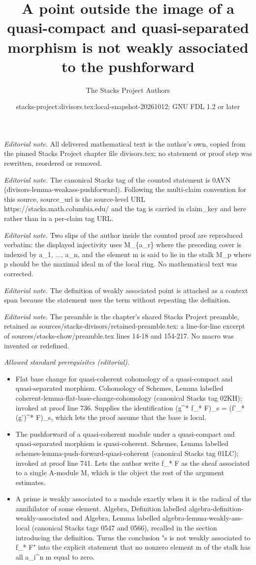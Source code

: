 \documentclass[10pt,a4paper]{amsart}
\title{A point outside the image of a quasi-compact and quasi-separated morphism is not weakly associated to the pushforward}
\author{The Stacks Project Authors}
\date{stacks-project:divisors.tex:local-snapshot-20261012; GNU FDL 1.2 or later}
\theoremstyle{plain}
\theoremstyle{definition}
\theoremstyle{remark}
\numberwithin{equation}{subsection}
\begin{document}
\maketitle
\noindent\textit{Editorial note.} All delivered mathematical text is the author's own, copied from the pinned Stacks Project chapter file divisors.tex; no statement or proof step was rewritten, reordered or removed.\par\medskip
\noindent\textit{Editorial note.} The canonical Stacks tag of the counted statement is 0AVN (divisors-lemma-weakass-pushforward). Following the multi-claim convention for this source, source\_url is the source-level URL https://stacks.math.columbia.edu/ and the tag is carried in claim\_key and here rather than in a per-claim tag URL.\par\medskip
\noindent\textit{Editorial note.} Two slips of the author inside the counted proof are reproduced verbatim: the displayed injectivity uses M\_\{a\_r\} where the preceding cover is indexed by a\_1, ..., a\_n, and the element m is said to lie in the stalk M\_p where p should be the maximal ideal m of the local ring. No mathematical text was corrected.\par\medskip
\noindent\textit{Editorial note.} The definition of weakly associated point is attached as a context span because the statement uses the term without repeating the definition.\par\medskip
\noindent\textit{Editorial note.} The preamble is the chapter's shared Stacks Project preamble, retained as sources/stacks-divisors/retained-preamble.tex: a line-for-line excerpt of sources/stacks-chow/preamble.tex lines 14-18 and 154-217. No macro was invented or redefined.\par\medskip
\noindent\textit{Allowed standard prerequisites (editorial).}\begin{itemize}
\item Flat base change for quasi-coherent cohomology of a quasi-compact and quasi-separated morphism. Cohomology of Schemes, Lemma labelled coherent-lemma-flat-base-change-cohomology (canonical Stacks tag 02KH); invoked at proof line 736. Supplies the identification (g\textasciicircum{}* f\_* F)\_s = (f'\_* (g')\textasciicircum{}* F)\_s, which lets the proof assume that the base is local.
\item The pushforward of a quasi-coherent module under a quasi-compact and quasi-separated morphism is quasi-coherent. Schemes, Lemma labelled schemes-lemma-push-forward-quasi-coherent (canonical Stacks tag 01LC); invoked at proof line 741. Lets the author write f\_* F as the sheaf associated to a single A-module M, which is the object the rest of the argument estimates.
\item A prime is weakly associated to a module exactly when it is the radical of the annihilator of some element. Algebra, Definition labelled algebra-definition-weakly-associated and Algebra, Lemma labelled algebra-lemma-weakly-ass-local (canonical Stacks tags 0547 and 0566), recalled in the section introducing the definition. Turns the conclusion "s is not weakly associated to f\_* F" into the explicit statement that no nonzero element m of the stalk has all a\_i\textasciicircum{}n m equal to zero.
\end{itemize}\medskip
\end{document}
